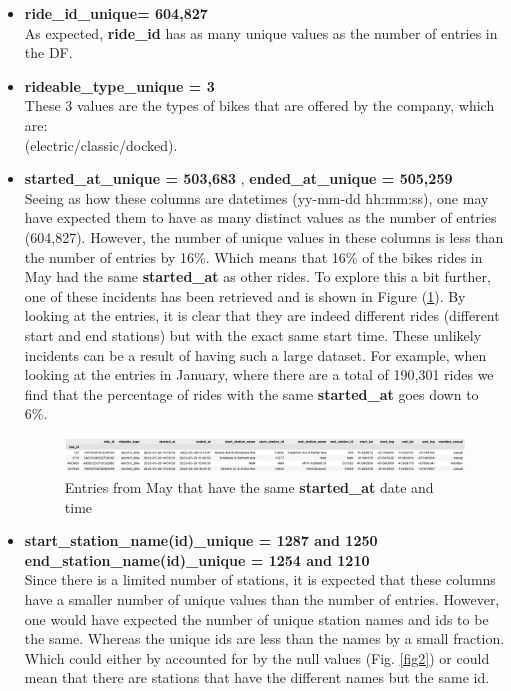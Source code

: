 \documentclass[12pt]{article}
\begin{document}
	\begin{itemize}
	\item \textbf{ride\_id\_unique= 604,827}   \\
	As expected, \textbf{ride\_id} has as many unique values as the number of entries in the DF.
	\item \textbf{rideable\_type\_unique = 3}  \\
	These 3 values are the types of bikes that are offered by the company, which are: \\
	(electric/classic/docked).
	\item \textbf{started\_at\_unique = 503,683} , \textbf{ended\_at\_unique = 505,259} \\
	Seeing as how these columns are datetimes (yy-mm-dd hh:mm:ss), one may have expected them to have as many distinct values as the number of entries (604,827). However, the number of unique values in these columns is less than the number of entries by 16\%. Which means that 16\% of the bikes rides in May had the same \textbf{started\_at} as other rides. To explore this a bit further, one of these incidents has been retrieved and is shown in Figure (\underline{\ref{fig10}}). By looking at the entries, it is clear that they are indeed different rides (different start and end stations) but with the exact same start time. These unlikely incidents can be a result of having such a large dataset. For example, when looking at the entries in January, where there are a total of 190,301 rides we find that the percentage of rides with the same \textbf{started\_at} goes down to 6\%.  \\
	
	\begin{figure}[h]
	\hspace{0.3in}
	\includegraphics[scale=0.4]{imgDups1.png}
	\caption{Entries from May that have the same \textbf{started\_at} date and time}
	\label{fig10}
	\end{figure}
	
	\item \textbf{start\_station\_name(id)\_unique = 1287 and 1250}\\
	 \textbf{end\_station\_name(id)\_unique = 1254 and 1210} \\
	Since there is a limited number of stations, it is expected that these columns have a smaller number of unique values than the number of entries. However, one would have expected the number of unique station names and ids to be the same. Whereas the unique ids are less than the names by a small fraction. Which could either by accounted for by the null values (Fig. \underline{\ref{fig2}}) or could mean that there are stations that have the different names but the same id.
	

\end{itemize}
\end{document}
